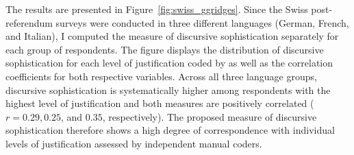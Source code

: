 The results are presented in Figure~\ref{fig:swiss_ggridges}. Since the Swiss post-referendum surveys were conducted in three different languages (German, French, and Italian), I computed the measure of discursive sophistication separately for each group of respondents. The figure displays the distribution of discursive sophistication for each level of justification coded by \citet{colombo2016justifications} as well as the correlation coefficients for both respective variables. Across all three language groups, discursive sophistication is systematically higher among respondents with the highest level of justification and both measures are positively correlated ($r=0.29, 0.25$, and $0.35$, respectively). The proposed measure of discursive sophistication therefore shows a high degree of correspondence with individual levels of justification assessed by independent manual coders.


